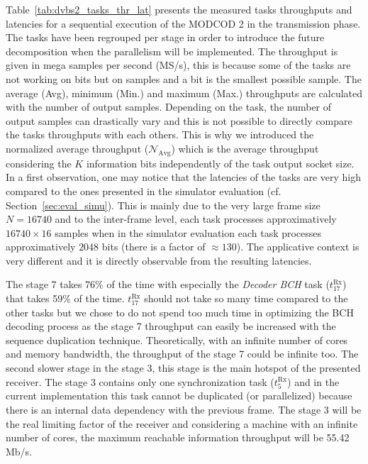 Table~\ref{tab:dvbs2_tasks_thr_lat} presents the measured tasks throughputs and
latencies for a sequential execution of the MODCOD 2 in the transmission phase.
The tasks have been regrouped per stage in order to introduce the future
decomposition when the parallelism will be implemented. The throughput is given
in mega samples per second (MS/s), this is because some of the tasks are not
working on bits but on samples and a bit is the smallest possible sample. The
average (Avg), minimum (Min.) and maximum (Max.) throughputs are calculated with
the number of output samples. Depending on the task, the number of output
samples can drastically vary and this is not possible to directly compare the
tasks throughputs with each others. This is why we introduced the normalized
average throughput ($\mathcal{N}_\text{Avg}$) which is the average throughput
considering the $K$ information bits independently of the task output socket
size. In a first observation, one may notice that the latencies of the tasks are
very high compared to the ones presented in the simulator evaluation (cf.
Section~\ref{sec:eval_simu}). This is mainly due to the very large frame size
$N = 16740$ and to the inter-frame level, each task processes approximatively
$16740 \times 16$ samples when in the simulator evaluation each task processes
approximatively $2048$ bits (there is a factor of $\approx 130$). The
applicative context is very different and it is directly observable from the
resulting latencies.

The stage 7 takes 76\% of the time with especially the \emph{Decoder BCH} task
($t^\text{Rx}_{17}$) that takes 59\% of the time. $t^\text{Rx}_{17}$ should not
take so many time compared to the other tasks but we chose to do not spend too
much time in optimizing the BCH decoding process as the stage 7 throughput can
easily be increased with the sequence duplication technique. Theoretically, with
an infinite number of cores and memory bandwidth, the throughput of the stage 7
could be infinite too.
The second slower stage in the stage 3, this stage is the main hotspot of the
presented receiver. The stage 3 contains only one synchronization task
($t^\text{Rx}_{5}$) and in the current implementation this task cannot be
duplicated (or parallelized) because there is an internal data dependency with
the previous frame. The stage 3 will be the real limiting factor of the receiver
and considering a machine with an infinite number of cores, the maximum
reachable information throughput will be 55.42 Mb/s.

